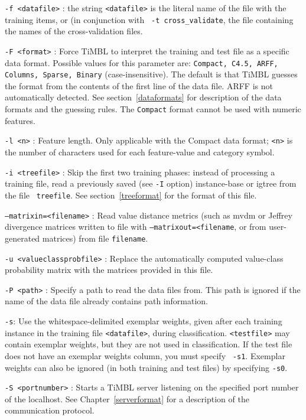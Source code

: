 \documentclass{report}
\begin{document}
\begin{description}

\item {\tt -f <datafile>} : the string {\tt <datafile>} is the literal
name of the file with the training items, or (in conjunction with {\tt
-t cross\_validate}, the file containing the names of the
cross-validation files.

\item {\tt -F <format>} : Force TiMBL to interpret the training and
test file as a specific data format. Possible values for this
parameter are: {\tt Compact, C4.5, ARFF, Columns, Sparse, Binary}
(case-insensitive). The default is that TiMBL guesses the format from
the contents of the first line of the data file. ARFF is not
automatically detected. See section~\ref{dataformats} for description
of the data formats and the guessing rules. The {\tt Compact} format
cannot be used with numeric features.

\item {\tt -l <n>} : Feature length. Only applicable with the Compact
  data format; {\tt <n>} is the number of characters used for each
  feature-value and category symbol.

\item {\tt -i <treefile>} : Skip the first two training phases:
  instead of processing a training file, read a previously saved (see
  {\tt -I} option) instance-base or {\sc igtree} from the file {\tt
    treefile}. See section~\ref{treeformat} for the format of this
  file.

\item {\tt --matrixin=<filename>} : Read value distance metrics (such as {\sc mvdm} or Jeffrey divergence matrices written to file with {\tt --matrixout=<filename}, or from user-generated matrices) from file {\tt filename}.

\item {\tt -u <valueclassprobfile>} : Replace the automatically
  computed value-class probability matrix with the matrices provided
  in this file.

\item {\tt -P <path>} : Specify a path to read the data files
  from. This path is ignored if the name of the data file already
  contains path information.

\item {\tt -s}: Use the whitespace-delimited exemplar weights, given
  after each training instance in the training file {\tt <datafile>},
  during classification. {\tt <testfile>} may contain exemplar
  weights, but they are not used in classification. If the test file
  does not have an exemplar weights column, you must specify {\tt
    -s1}. Exemplar weights can also be ignored (in both training and
  test files) by specifying {\tt -s0}.

\item {\tt -S <portnumber>} : Starts a TiMBL server listening on the
  specified port number of the localhost. See
  Chapter~\ref{serverformat} for a description of the communication
  protocol.

\end{description}
\end{document}

